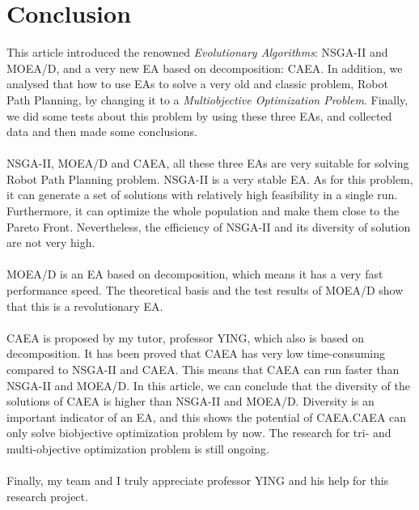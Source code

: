 \documentclass[a4paper, 11pt]{article}
\begin{document}

\section{Conclusion}
This article introduced the renowned \emph{Evolutionary Algorithms}:
NSGA-II and MOEA/D, and a very new EA based on decomposition: CAEA.
In addition, we analysed that how to use EAs to solve a very old and classic problem,
Robot Path Planning, by changing it to a \emph{Multiobjective Optimization Problem}.
Finally, we did some tests about this problem by using these three EAs, and collected
data and then made some conclusions.\\
\\
NSGA-II, MOEA/D and CAEA, all these three EAs are very suitable for solving Robot Path Planning problem. NSGA-II is a very stable EA.
As for this problem, it can generate a set of solutions with relatively high feasibility in a single run. Furthermore, it can optimize the whole
population and make them close to the Pareto Front. Nevertheless, the efficiency of NSGA-II and its diversity of solution are not very high.\\
\\
MOEA/D is an EA based on decomposition, which means it has a very fast
performance speed. The theoretical basis and the test results of MOEA/D
show that this is a revolutionary EA.\\
\\
CAEA is proposed by my tutor, professor YING, which also is based on decomposition.
It has been proved that CAEA has very low time-consuming compared to NSGA-II and CAEA.
This means that CAEA can run faster than NSGA-II and MOEA/D. In this article,
we can conclude that the diversity of the solutions of CAEA is higher than NSGA-II
and MOEA/D. Diversity is an important indicator of an EA, and this shows the potential
of CAEA.CAEA can only solve biobjective optimization problem by now. The research for tri-
and multi-objective optimization problem is still ongoing. \\
\\
Finally, my team and I truly appreciate professor YING and his help for this research project.
\newpage



%


\end{document}
